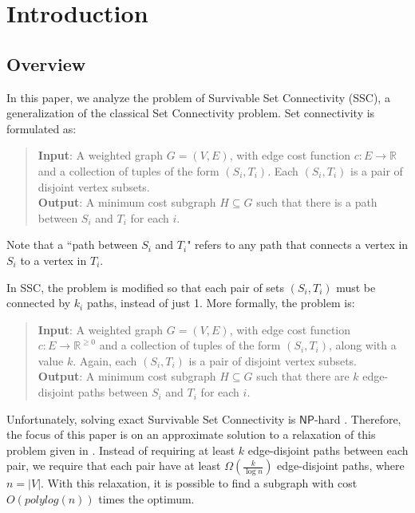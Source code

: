 \documentclass[12pt]{article}
\begin{document}
\maketitle

\section{Introduction}

\subsection{Overview}

In this paper, we analyze the problem of Survivable Set Connectivity (SSC), a generalization of the classical Set Connectivity problem. Set connectivity is formulated as:
\begin{quote}
\textbf{Input}: A weighted graph $G = (V, E)$, with edge cost function $c: E \rightarrow \mathbb{R}$ and a collection of tuples of the form $(S_i, T_i)$. Each $(S_i,T_i)$ is a pair of disjoint vertex subsets. \\
\textbf{Output}: A minimum cost subgraph $H \subseteq G$ such that there is a path between $S_i$ and $T_i$ for each $i$. 
\end{quote}

Note that a ``path between $S_i$ and $T_i$" refers to any path that connects a vertex in $S_i$ to a vertex in $T_i$.

In SSC, the problem is modified so that each pair of sets $(S_i,T_i)$ must be connected by $k_i$ paths, instead of just 1. More formally, the problem is:

\begin{quote}
\textbf{Input}: A weighted graph $G = (V, E)$, with edge cost function $c: E \rightarrow \mathbb{R}^{\geq 0}$ and a collection of tuples of the form $(S_i, T_i)$, along with a value $k$. Again, each $(S_i,T_i)$ is a pair of disjoint vertex subsets. \\
\textbf{Output}: A minimum cost subgraph $H \subseteq G$ such that there are $k$ edge-disjoint paths between $S_i$ and $T_i$ for each $i$. 
\end{quote}

Unfortunately, solving exact Survivable Set Connectivity is $\mathsf{NP}$-hard \cite{ssc}. Therefore, the focus of this paper is on an approximate solution to a relaxation of this problem given in \cite{ssc}. Instead of requiring at least $k$ edge-disjoint paths between each pair, we require that each pair have at least $\Omega(\frac{k}{\log n})$ edge-disjoint paths, where $n = |V|$. With this relaxation, it is possible to find a subgraph with cost $O(polylog(n))$ times the optimum.
\end{document}
